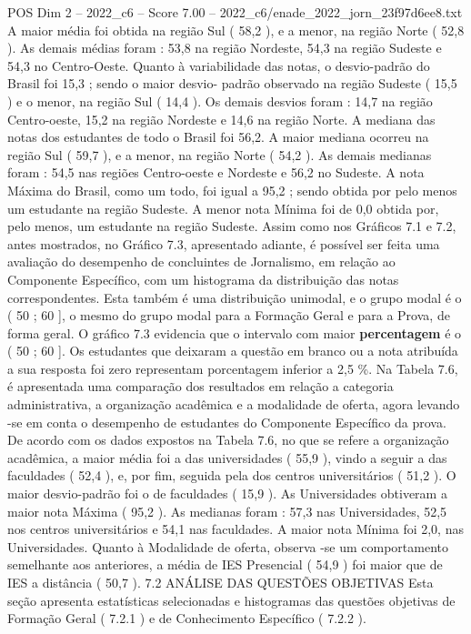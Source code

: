\begin{textsample}{POS Dim 2 – 2022\_c6 – Score 7.00 – 2022\_c6/enade\_2022\_jorn\_23f97d6ee8.txt}
A maior média foi obtida na região Sul ( 58,2 ), e a menor, na região Norte ( 52,8 ).
As demais médias foram : 53,8 na região Nordeste, 54,3 na região Sudeste e 54,3 no Centro-Oeste.
Quanto à variabilidade das notas, o desvio-padrão do Brasil foi 15,3 ; sendo o maior desvio- padrão observado na região Sudeste ( 15,5 ) e o menor, na região Sul ( 14,4 ).
Os demais desvios foram : 14,7 na região Centro-oeste, 15,2 na região Nordeste e 14,6 na região Norte.
A mediana das notas dos estudantes de todo o Brasil foi 56,2.
A maior mediana ocorreu na região Sul ( 59,7 ), e a menor, na região Norte ( 54,2 ).
As demais medianas foram : 54,5 nas regiões Centro-oeste e Nordeste e 56,2 no Sudeste.
A nota Máxima do Brasil, como um todo, foi igual a 95,2 ; sendo obtida por pelo menos um estudante na região Sudeste.
A menor nota Mínima foi de 0,0 obtida por, pelo menos, um estudante na região Sudeste.
Assim como nos Gráficos 7.1 e 7.2, antes mostrados, no Gráfico 7.3, apresentado adiante, é possível ser feita uma avaliação do desempenho de concluintes de Jornalismo, em relação ao Componente Específico, com um histograma da distribuição das notas correspondentes.
Esta também é uma distribuição unimodal, e o grupo modal é o ( 50 ; 60 ], o mesmo do grupo modal para a Formação Geral e para a Prova, de forma geral.
O gráfico 7.3 evidencia que o intervalo com maior \textbf{percentagem} é o ( 50 ; 60 ].
Os estudantes que deixaram a questão em branco ou a nota atribuída a sua resposta foi zero representam porcentagem inferior a 2,5 \%.
Na Tabela 7.6, é apresentada uma comparação dos resultados em relação a categoria administrativa, a organização acadêmica e a modalidade de oferta, agora levando -se em conta o desempenho de estudantes do Componente Específico da prova.
De acordo com os dados expostos na Tabela 7.6, no que se refere a organização acadêmica, a maior média foi a das universidades ( 55,9 ), vindo a seguir a das faculdades ( 52,4 ), e, por fim, seguida pela dos centros universitários ( 51,2 ).
O maior desvio-padrão foi o de faculdades ( 15,9 ).
As Universidades obtiveram a maior nota Máxima ( 95,2 ).
As medianas foram : 57,3 nas Universidades, 52,5 nos centros universitários e 54,1 nas faculdades.
A maior nota Mínima foi 2,0, nas Universidades.
Quanto à Modalidade de oferta, observa -se um comportamento semelhante aos anteriores, a média de IES Presencial ( 54,9 ) foi maior que de IES a distância ( 50,7 ). 7.2 ANÁLISE DAS QUESTÕES OBJETIVAS Esta seção apresenta estatísticas selecionadas e histogramas das questões objetivas de Formação Geral ( 7.2.1 ) e de Conhecimento Específico ( 7.2.2 ).

\end{textsample}
